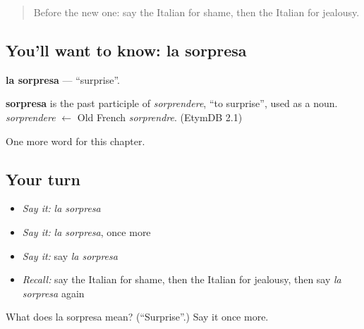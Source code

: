 \label{lesson:IT-C216-sorpresa}



\begin{quote}
Before the new one: say the Italian for shame, then the Italian for jealousy.
\end{quote}

\subsection*{You'll want to know: la sorpresa}
\textbf{la sorpresa} — \textquotedblleft{}surprise\textquotedblright{}.

\begin{cousinweb}
\textbf{sorpresa} is the past participle of \emph{sorprendere}, \textquotedblleft{}to surprise\textquotedblright{}, used as a noun. \emph{sorprendere} $\leftarrow$ Old French \emph{sorprendre}. (EtymDB 2.1)
\end{cousinweb}

\begin{grammarlens}[title={What you've built}]
One more word for this chapter.
\end{grammarlens}

\subsection*{Your turn}
\begin{itemize}
\raggedright
  \item \emph{Say it:} \emph{la sorpresa}
  \item \emph{Say it:} \emph{la sorpresa}, once more
  \item \emph{Say it:} say \emph{la sorpresa}
  \item \emph{Recall:} say the Italian for shame, then the Italian for jealousy, then say \emph{la sorpresa} again
\end{itemize}

\begin{tcolorbox}[breakable,colback=teal!4,colframe=teal!35!black,title={Before you move on}]
What does la sorpresa mean? (\textquotedblleft{}Surprise\textquotedblright{}.) Say it once more.
\end{tcolorbox}
